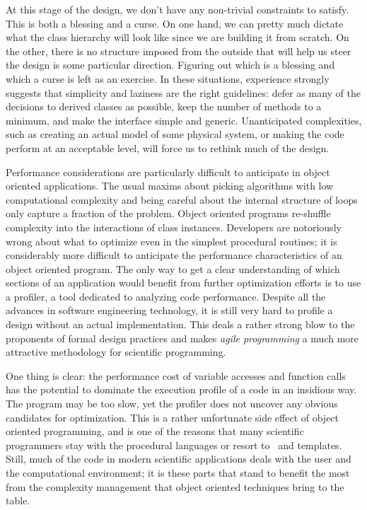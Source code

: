 At this stage of the design, we don't have any non-trivial constraints to satisfy. This is both
a blessing and a curse. On one hand, we can pretty much dictate what the class hierarchy will
look like since we are building it from scratch. On the other, there is no structure imposed
from the outside that will help us steer the design is some particular direction. Figuring out
which is a blessing and which a curse is left as an exercise. In these situations, experience
strongly suggests that simplicity and laziness are the right guidelines: defer as many of the
decisions to derived classes as possible, keep the number of methods to a minimum, and make the
interface simple and generic. Unanticipated complexities, such as creating an actual model of
some physical system, or making the code perform at an acceptable level, will force us to
rethink much of the design.

Performance considerations are particularly difficult to anticipate in object oriented
applications. The usual maxims about picking algorithms with low computational complexity and
being careful about the internal structure of loops only capture a fraction of the problem.
Object oriented programs re-shuffle complexity into the interactions of class instances.
Developers are notoriously wrong about what to optimize even in the simplest procedural
routines; it is considerably more difficult to anticipate the performance characteristics of an
object oriented program. The only way to get a clear understanding of which sections of an
application would benefit from further optimization efforts is to use a profiler, a tool
dedicated to analyzing code performance. Despite all the advances in software engineering
technology, it is still very hard to profile a design without an actual implementation. This
deals a rather strong blow to the proponents of formal design practices\supercite{uml} and
makes {\em agile programming}\supercite{agile} a much more attractive methodology for
scientific programming.

One thing is clear: the performance cost of variable accesses and function calls has the
potential to dominate the execution profile of a code in an insidious way. The program may be
too slow, yet the profiler does not uncover any obvious candidates for optimization. This is a
rather unfortunate side effect of object oriented programming, and is one of the reasons that
many scientific programmers stay with the procedural languages or resort to \cpp\ and
templates. Still, much of the code in modern scientific applications deals with the user and
the computational environment; it is these parts that stand to benefit the most from the
complexity management that object oriented techniques bring to the table.

